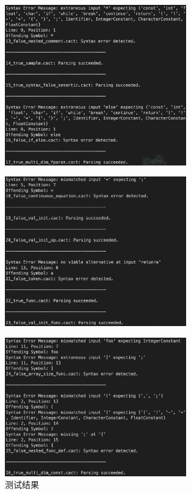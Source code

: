 \documentclass[UTF8]{report}
\begin{document}
\begin{figure}[H]
    \centering
    \includegraphics[width=0.7\textwidth]{fig/res13_17.png}
\end{figure}

\begin{figure}[H]
    \centering
    \includegraphics[width=0.7\textwidth]{fig/res18_23.png}
\end{figure}

\begin{figure}[H]
    \centering
    \includegraphics[width=0.7\textwidth]{fig/res24_26.png}
    \caption{测试结果}
\end{figure}
\end{document}
